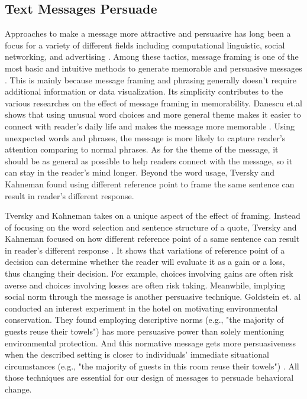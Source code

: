 \subsection{Text Messages Persuade}
Approaches to make a message more attractive and persuasive has long been a focus for a variety of different fields including computational linguistic, social networking, and advertising \cite{smith1996message,tversky1981framing,danescu2012you,huntertowards,maheswaran1990influence,grewal1994moderating}. Among these tactics, message framing is one of the most basic and intuitive methods to generate memorable and persuasive messages \cite{smith1996message,tversky1981framing}. This is mainly because message framing and phrasing generally doesn't require additional information or data visualization. Its simplicity contributes to the various researches on the effect of message framing in memorability. Danescu et.al shows that using unusual word choices and more general theme makes it easier to connect with reader's daily life and makes the message more memorable \cite{danescu2012you}. Using unexpected words and phrases, the message is more likely to capture reader's attention comparing to normal phrases. As for the theme of the message, it should be as general as possible to help readers connect with the message, so it can stay in the reader's mind longer. Beyond the word usage, Tversky and Kahneman found using different reference point to frame the same sentence can result in reader's different response\cite{tversky1992advances,tversky1981framing,kahneman1984choices}.\par
Tversky and Kahneman takes on a unique aspect of the effect of framing. Instead of focusing on the word selection and sentence structure of a quote, Tversky and Kahneman focused on how different reference point of a same sentence can result in reader's different response \cite{tversky1981framing}. It shows that variations of reference point of a decision can determine whether the reader will evaluate it as a gain or a loss, thus changing their decision. For example, choices involving gains are often risk averse and choices involving losses are often risk taking. Meanwhile, implying social norm through the message is another persuasive technique.  Goldstein et. al conducted an interest experiment in the hotel on motivating environmental conservation. They found employing descriptive norms (e.g., "the majority of guests reuse their towels") has more persuasive power than solely mentioning environmental protection. And this normative message gets more persuasiveness when the described setting is closer to individuals' immediate situational circumstances (e.g., "the majority of guests in this room reuse their towels") \cite{goldstein2008room}.  All those techniques are essential for our design of messages to persuade behavioral change.\par


